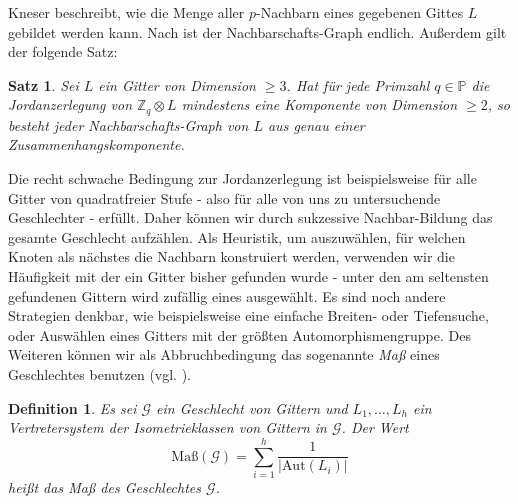 \documentclass[12pt,a4paper,halfparskip,headsepline,bibtotocnumbered]{scrreprt}
\theoremstyle{nummermitklammern}
\newtheorem{definition}[defsatzusw]{Definition}
\newtheorem{satz}[defsatzusw]{Satz}
\theoremstyle{nonumberbreak}
\newcommand{\Z}{\mathbb{Z}}
\renewcommand{\P}{\mathbb{P}}
\newcommand{\Aut}{\text{Aut}}
\begin{document}
Kneser beschreibt, wie die Menge aller $p$-Nachbarn eines gegebenen Gittes $L$ gebildet werden kann.  Nach \cite{scharlau} ist der Nachbarschafts-Graph endlich. Außerdem gilt der folgende Satz:

\begin{framed}
	\begin{satz}\label{th:neighbourgraph}
		Sei $L$ ein Gitter von Dimension $\geq 3$. Hat für jede Primzahl $q \in \P$ die Jordanzerlegung von $\Z_q \otimes L$ mindestens eine Komponente von Dimension $\geq 2$, so besteht jeder Nachbarschafts-Graph von $L$ aus genau einer Zusammenhangskomponente.
	\end{satz}
\end{framed}

Die recht schwache Bedingung zur Jordanzerlegung ist beispielsweise für alle Gitter von quadratfreier Stufe - also für alle von uns zu untersuchende Geschlechter - erfüllt. Daher können wir durch sukzessive Nachbar-Bildung das gesamte Geschlecht aufzählen. Als Heuristik, um auszuwählen, für welchen Knoten als nächstes die Nachbarn konstruiert werden, verwenden wir die Häufigkeit mit der ein Gitter bisher gefunden wurde - unter den am seltensten gefundenen Gittern wird zufällig eines ausgewählt. Es sind noch andere Strategien denkbar, wie beispielsweise eine einfache Breiten- oder Tiefensuche, oder Auswählen eines Gitters mit der größten Automorphismengruppe. Des Weiteren können wir als Abbruchbedingung das sogenannte \textit{Maß} eines Geschlechtes benutzen (vgl. \cite[Abschnitt 35]{kneser}).

\begin{framed}
	\begin{definition}
		Es sei $\mathcal{G}$ ein Geschlecht von Gittern und $L_1, \dots, L_h$ ein Vertretersystem der Isometrieklassen von Gittern in $\mathcal{G}$. Der Wert
		\begin{equation*}
			\text{Maß}(\mathcal{G}) = \sum_{i=1}^h \frac{1}{\vert \Aut(L_i) \vert}
		\end{equation*}
		heißt das \textit{Maß} des Geschlechtes $\mathcal{G}$.
	\end{definition}
\end{framed}
\end{document}
